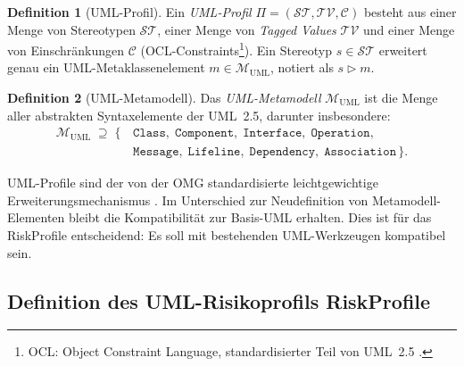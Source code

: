 ﻿\documentclass[a4paper,12pt]{article}
\theoremstyle{definition}
\newtheorem{definition}{Definition}
\begin{document}
\begin{definition}[UML-Profil]
\label{def:uml-profil}
    Ein \emph{UML-Profil} $\Pi = (\mathcal{ST}, \mathcal{TV}, \mathcal{C})$ besteht
    aus einer Menge von Stereotypen $\mathcal{ST}$, einer Menge von \emph{Tagged Values}
    $\mathcal{TV}$ und einer Menge von Einschr\"ankungen $\mathcal{C}$
    (OCL-Constraints\footnote{OCL: Object Constraint Language, standardisierter Teil
    von UML~2.5 \cite{omg2017}.}). Ein Stereotyp $s \in \mathcal{ST}$ erweitert genau
    ein UML-Metaklassenelement $m \in \mathcal{M}_{\mathrm{UML}}$, notiert als
    $s \triangleright m$.
\end{definition}

\begin{definition}[UML-Metamodell]
    Das \emph{UML-Metamodell} $\mathcal{M}_{\mathrm{UML}}$ ist die Menge aller
    abstrakten Syntaxelemente der UML~2.5, darunter insbesondere:
    \begin{align*}
        \mathcal{M}_{\mathrm{UML}} \;\supseteq\;
        \{\,&\texttt{Class},\; \texttt{Component},\; \texttt{Interface},\;
               \texttt{Operation},\\
            &\texttt{Message},\; \texttt{Lifeline},\;
               \texttt{Dependency},\; \texttt{Association}\,\}.
    \end{align*}
\end{definition}

UML-Profile sind der von der OMG standardisierte leichtgewichtige Erweiterungsmechanismus
\cite{omg2017}. Im Unterschied zur Neudefinition von Metamodell-Elementen bleibt die
Kompatibilit\"at zur Basis-UML erhalten. Dies ist f\"ur das \textsf{RiskProfile}
entscheidend: Es soll mit bestehenden UML-Werkzeugen kompatibel sein.

\subsection{Definition des UML-Risikoprofils \textsf{RiskProfile}}
\end{document}
